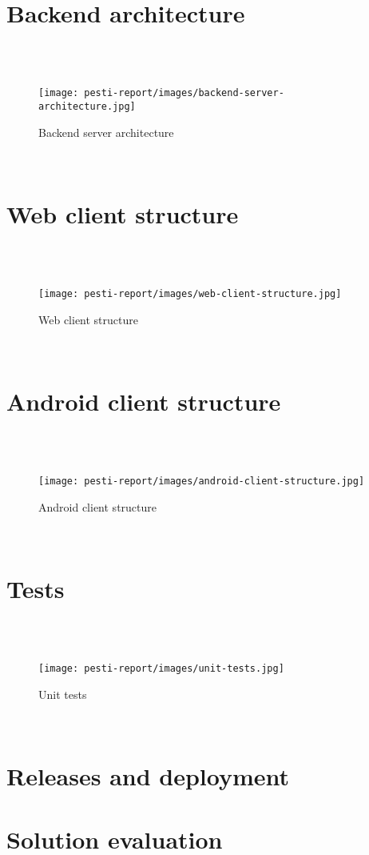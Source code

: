 \section{Backend architecture}


\\ \\
\begin{figure}[!h]
	\centering
	\texttt{[image: pesti-report/images/backend-server-architecture.jpg]}
	\caption{Backend server architecture}
	\label{fig:backend-server-architecture}
\end{figure}
\\


\section{Web client structure}

\\ \\
\begin{figure}[!h]
	\centering
	\texttt{[image: pesti-report/images/web-client-structure.jpg]}
	\caption{Web client structure}
	\label{fig:web-client-structure}
\end{figure}
\\


\section{Android client structure}


\\ \\
\begin{figure}[!h]
	\centering
	\texttt{[image: pesti-report/images/android-client-structure.jpg]}
	\caption{Android client structure}
	\label{fig:android-client-structure}
\end{figure}
\\




\section{Tests}


\\ \\
\begin{figure}[!h]
	\centering
	\texttt{[image: pesti-report/images/unit-tests.jpg]}
	\caption{Unit tests}
	\label{fig:unit-tests}
\end{figure}
\\

\section{Releases and deployment}

\section{Solution evaluation}

